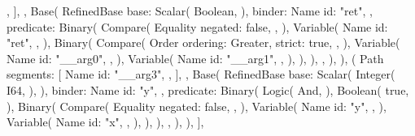 \documentclass[
  oneside,
  english,
  coorientadorbanca,
  noabntexcite
]{ufsc-thesis-rn46-2019}
\begin{document}
\begin{rustcode}
{{{                    },
                ],
            },
            Base(
                RefinedBase {
                    base: Scalar(
                        Boolean,
                    ),
                    binder: Name {
                        id: "ret",
                    },
                    predicate: Binary(
                        Compare(
                            Equality {
                                negated: false,
                            },
                        ),
                        Variable(
                            Name {
                                id: "ret",
                            },
                        ),
                        Binary(
                            Compare(
                                Order {
                                    ordering: Greater,
                                    strict: true,
                                },
                            ),
                            Variable(
                                Name {
                                    id: "__arg0",
                                },
                            ),
                            Variable(
                                Name {
                                    id: "__arg1",
                                },
                            ),
                        ),
                    ),
                },
            ),
        ),
        (
            Path {
                segments: [
                    Name {
                        id: "__arg3",
                    },
                ],
            },
            Base(
                RefinedBase {
                    base: Scalar(
                        Integer(
                            I64,
                        ),
                    ),
                    binder: Name {
                        id: "y",
                    },
                    predicate: Binary(
                        Logic(
                            And,
                        ),
                        Boolean(
                            true,
                        ),
                        Binary(
                            Compare(
                                Equality {
                                    negated: false,
                                },
                            ),
                            Variable(
                                Name {
                                    id: "y",
                                },
                            ),
                            Variable(
                                Name {
                                    id: "x",
                                },
                            ),
                        ),
                    ),
                },
            ),
        ),
    ],
}
\end{rustcode}
\end{document}
